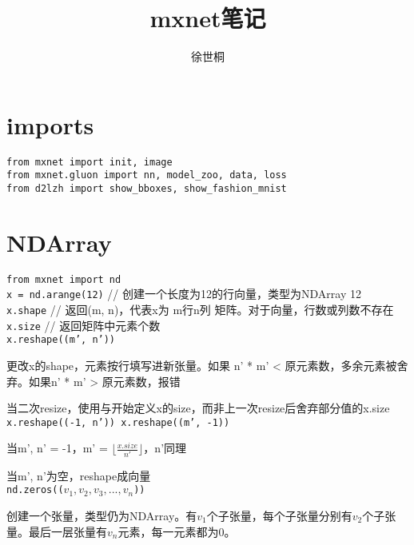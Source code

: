 \documentclass[UTF8]{ctexart}
\title{mxnet笔记}
\author{徐世桐}
\date{}
\begin{document}
\maketitle

\section{imports}
\noindent \texttt{from mxnet import init, image}\\
\texttt{from mxnet.gluon import nn, model\_zoo, data, loss}\\
\texttt{from d2lzh import show\_bboxes, show\_fashion\_mnist}

\section{NDArray}

\noindent \texttt{from mxnet import nd}\\
\texttt{x = nd.arange(12)} // 创建一个长度为12的行向量，类型为NDArray 12\\
\texttt{x.shape} // 返回(m, n)，代表x为 m行n列 矩阵。对于向量，行数或列数不存在\\
\texttt{x.size} // 返回矩阵中元素个数\\
\texttt{x.reshape((m', n'))}

  更改x的shape，元素按行填写进新张量。如果 n' * m' < 原元素数，多余元素被舍弃。如果n' * m' > 原元素数，报错

  当二次resize，使用与开始定义x的size，而非上一次resize后舍弃部分值的x.size\\
\texttt{x.reshape((-1, n')) x.reshape((m', -1))}
 
  当m', n' = -1，m' = $\lfloor \frac{x.size}{n'}\rfloor $，n'同理

  当m', n'为空，reshape成向量\\
\texttt{nd.zeros(($v_1, v_2, v_3, ..., v_n$))}
  
  创建一个张量，类型仍为NDArray。有$v_1$个子张量，每个子张量分别有$v_2$个子张量。最后一层张量有$v_n$元素，每一元素都为0。
  
\end{document}
